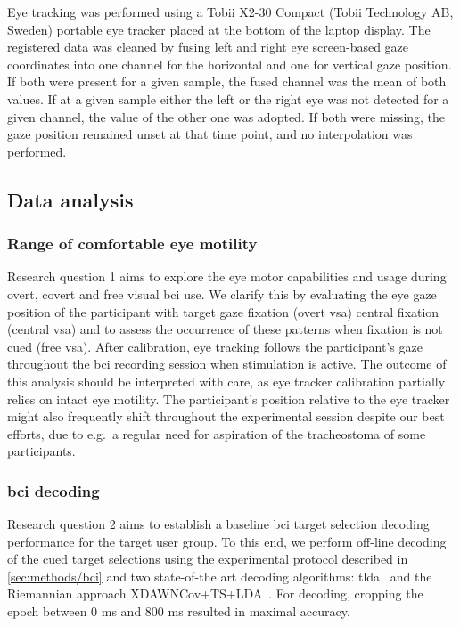 \documentclass{article}
\begin{document}
Eye tracking was performed using a Tobii X2-30 Compact (Tobii Technology AB, Sweden) portable eye tracker placed at the bottom of the laptop display.
The registered data was cleaned by fusing left and right eye screen-based gaze
coordinates into one channel for the horizontal and one for vertical gaze position.
If both were present for a given sample, the fused channel was the mean of both
values.
If at a given sample either the left or the right eye was not detected for a
given channel, the value of the other one was adopted.
If both were missing, the gaze position remained unset at that time point, and no
interpolation was performed.


\subsection{Data analysis}
\subsubsection{Range of comfortable eye motility}

Research question 1 aims to explore the eye motor capabilities and usage during
overt, covert and free visual \ac{bci} use.
We clarify this by evaluating the eye gaze position of the participant with
target gaze fixation (overt \ac{vsa}) central fixation (central \ac{vsa})
and to assess the occurrence of these patterns when fixation is not cued
(free \ac{vsa}).
After calibration, eye tracking follows the participant's gaze throughout the
\ac{bci} recording session when stimulation is active.
The outcome of this analysis should be interpreted with care, as eye tracker
calibration partially relies on intact eye motility.
The participant's position relative to the eye tracker might also frequently shift
throughout the experimental session despite our best efforts, due to e.g.\ a
regular need for aspiration of the tracheostoma of some participants.


\subsubsection{\Ac{bci} decoding}

Research question 2 aims to establish a baseline \ac{bci} target selection
decoding performance for the target user group.
To this end, we perform off-line decoding of the cued target selections using
the experimental protocol described in \cref{sec:methods/bci}
and two state-of-the art decoding algorithms: \ac{tlda}~\cite{Sosulski2022}
and the Riemannian approach XDAWNCov+TS+LDA~\cite{Cecotti2017}.
For decoding, cropping the epoch between 0 ms and 800 ms
resulted in maximal accuracy.
\end{document}
